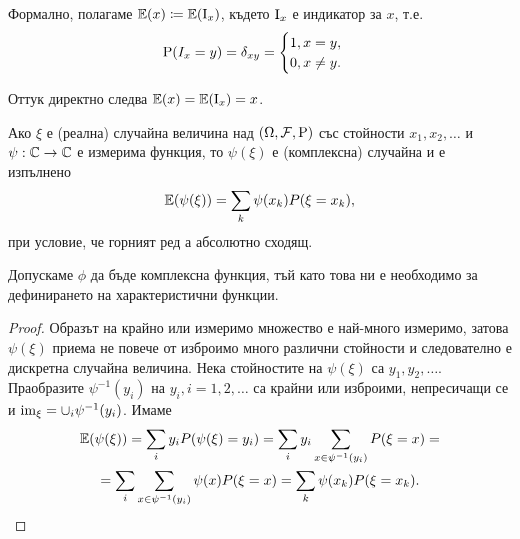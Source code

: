 \documentclass[numbers=endperiod, DIV=15, bibliography=totocnumbered]{scrartcl}
\begin{document}
\begin{note}
  Формално, полагаме $\mathbb{E}(x) \coloneqq \mathbb{E}(\operatorname{I}_x)$, където $\operatorname{I}_x$ е индикатор за $x$, т.е.
  \begin{displaymath}
    \operatorname{P}(I_x = y) = \delta_{xy} = \begin{cases}
      1, x = y, \\
      0, x \neq y.
    \end{cases}
  \end{displaymath}

  Оттук директно следва $\mathbb{E}(x) = \mathbb{E}(\operatorname{I}_x) = x$.
\end{note}

\begin{proposition}\label{thm:lotus}
  Ако $\xi$ е (реална) случайна величина над $(\Omega, \mathcal{F}, \operatorname{P})$ със стойности $x_1, x_2, \ldots$ и $\psi: \mathbb{C} \to \mathbb{C}$ е измерима функция, то $\psi(\xi)$ е (комплексна) случайна и е изпълнено
  \begin{displaymath}
    \mathbb{E}(\psi(\xi))
    =
    \sum_k \psi(x_k) P(\xi = x_k),
  \end{displaymath}
  при условие, че горният ред а абсолютно сходящ.
\end{proposition}

\begin{note}
  Допускаме $\phi$ да бъде комплексна функция, тъй като това ни е необходимо за дефинирането на характеристични функции.
\end{note}

\begin{proof}
  Образът на крайно или измеримо множество е най-много измеримо, затова $\psi(\xi)$ приема не повече от изброимо много различни стойности и следователно е дискретна случайна величина. Нека стойностите на $\psi(\xi)$ са $y_1, y_2, \ldots$. Праобразите $\psi^{-1}(y_i)$ на $y_i, i = 1, 2, \ldots$ са крайни или изброими, непресичащи се и $\operatorname{im}_\xi = \cup_i \psi^{-1}(y_i)$. Имаме
  \begin{multline*}
    \mathbb{E}(\psi(\xi))
    =
    \sum_i y_i P(\psi(\xi) = y_i)
    =
    \sum_i y_i \sum_{x \in \psi^{-1}(y_i)} P(\xi = x)
    = \\ =
    \sum_i \sum_{x \in \psi^{-1}(y_i)} \psi(x) P(\xi = x)
    =
    \sum_k \psi(x_k) P(\xi = x_k).
  \end{multline*}
\end{proof}
\end{document}
